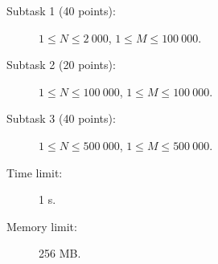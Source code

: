 \documentclass{boi2014}
\begin{document}
    \Scoring

    \begin{description}
        \item[Subtask 1 (40 points):] $1 \le N \le 2\ 000$, $1 \le M \le 100\ 000$.
        \item[Subtask 2 (20 points):] $1 \le N \le 100\ 000$, $1 \le M \le 100\ 000$.
        \item[Subtask 3 (40 points):] $1 \le N \le 500\ 000$, $1 \le M \le 500\ 000$.
    \end{description}

    \Constraints

    \begin{description}
        \item[Time limit:] 1 s.
        \item[Memory limit:] 256 MB.
    \end{description}
\end{document}
